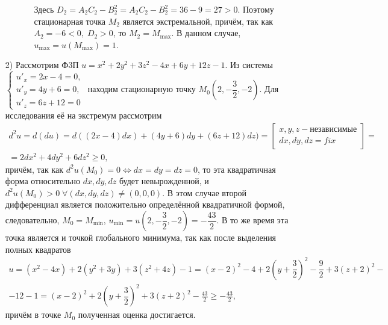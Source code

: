 \documentclass[../../main.tex]{subfiles}
\begin{document}
\begin{itemize}
\begin{itemize}
\begin{itemize}
                Здесь $D_2 = A_2C_2 - B_2^2 =
                A_2C_2 - B_2^2 = 36 - 9 = 27 > 0$. Поэтому стационарная
                точка $M_2$ является экстремальной, причём, так как $A_2 = -6 <
                0, \; D_2 > 0$, то $M_2 = M_{\max}$. В данном случае,
                $u_{\max} = u(M_{\max}) = 1$.
            \end{itemize}
        \end{itemize}
        \item[2)] Рассмотрим Ф3П $u = x^2 + 2y^2 + 3z^2 - 4x + 6y +12z-1$.
        Из системы
        $\begin{cases}
            u'_x = 2x-4 = 0, \\
            u'_y = 4y+6 = 0, \\
            u'_z = 6z+12 = 0
        \end{cases}$ находим стационарную точку $M_0\left(2, -\dfrac32,
        -2\right)$. Для исследования её на экстремум рассмотрим
        \begin{multline*}
            d^2u = d(du) = d((2x-4)dx)+(4y+6)dy+(6z+12)dz) =
            \left[
                \begin{gathered}
                    x, y, z - \text{независимые} \\
                    dx, dy, dz = fix
                \end{gathered}
            \right] = \\ = 2dx^2 + 4dy^2 + 6dz^2 \geq 0,
        \end{multline*}
        причём, так как $d^2u(M_0)=0 \iff dx=dy=dz=0$, то эта квадратичная
        форма относительно $dx, dy, dz$ будет невырожденной, и $d^2u(M_0)>0
        \; \forall (dx, dy, dz) \ne (0,0,0)$. В этом случае второй
        дифференциал является положительно определённой квадратичной формой,
        следовательно, $M_0 = M_{\min}$, $u_{\min} = u\left(2, -\dfrac32,
        -2\right) = -\dfrac{43}2$. В то же время эта точка является и точкой
        глобального минимума, так как после выделения полных квадратов
        \begin{multline*}
            u = (x^2-4x) + 2(y^2+3y) + 3(z^2+4z)-1 = (x-2)^2 - 4 + 2\left(y+
            \dfrac32\right)^2 - \dfrac92 + 3(z+2)^2 -\\- 12 - 1 = (x-2)^2 +
            2\left(y+\dfrac32\right)^2 + 3(z+2)^2 - \frac{43}2 \geq
            -\frac{43}2,
        \end{multline*}
        причём в точке $M_0$ полученная оценка достигается.
    \end{itemize}
\end{document}
